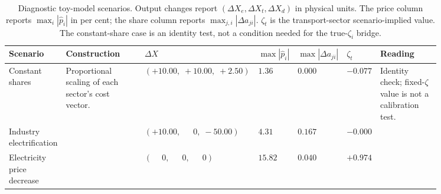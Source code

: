 \begin{longtable}{P{0.12\linewidth}P{0.22\linewidth}C{0.12\linewidth}C{0.08\linewidth}C{0.08\linewidth}C{0.06\linewidth}P{0.17\linewidth}}
\caption{Diagnostic toy-model scenarios. Output changes report $(\Delta X_e,\Delta X_t,\Delta X_d)$ in physical units. The price column reports $\max_i |\hat p_i|$ in per cent; the share column reports $\max_{j,i}|\Delta a_{ji}|$. $\zeta_t$ is the transport-sector scenario-implied value. The constant-share case is an identity test, not a condition needed for the true-$\zeta_i$ bridge.}
\label{tab:toy_diagnostic_scenarios}\\

\hline
Scenario & Construction & $\Delta X$ & $\max |\hat p_i|$ & $\max |\Delta a_{ji}|$ & $\zeta_t$ & Reading \\
\hline
\endhead
Constant shares & Proportional scaling of each sector's cost vector. & $(+10.00,\; +10.00,\; +2.50)$ & $1.36$ & $0.000$ & $-0.077$ & Identity check; fixed-$\zeta$ value is not a calibration test. \\
Industry electrification &  & $(+10.00,\; \phantom{-}0,\; -50.00)$ & $4.31$ & $0.167$ & $-0.000$ &  \\
Electricity price decrease &  & $(\phantom{-}0,\; \phantom{-}0,\; \phantom{-}0)$ & $15.82$ & $0.040$ & $+0.974$ &  \\
\hline
\end{longtable}
